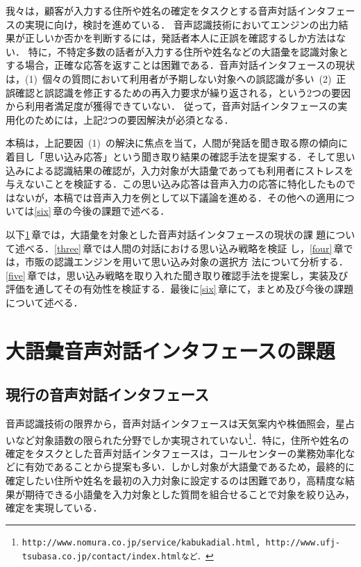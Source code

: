 我々は，顧客が入力する住所や姓名の確定をタスクとする音声対話インタフェースの実現に向け，検討を進めている．
音声認識技術においてエンジンの出力結果が正しいか否かを判断するには，発話者本人に正誤を確認するしか方法はない．
特に，不特定多数の話者が入力する住所や姓名などの大語彙を認識対象とする場合，正確な応答を返すことは困難である．音声対話インタフェースの現状は，(1)~個々の質問において利用者が予期しない対象への誤認識が多い~(2)~正誤確認と誤認識を修正するための再入力要求が繰り返される，という2つの要因から利用者満足度が獲得できていない．
従って，音声対話インタフェースの実用化のためには，上記2つの要因解決が必須となる．

本稿は，上記要因~(1)~の解決に焦点を当て，人間が発話を聞き取る際の傾向に着目し「思い込み応答」という聞き取り結果の確認手法を提案する．そして思い込みによる認識結果の確認が，入力対象が大語彙であっても利用者にストレスを与えないことを検証する．この思い込み応答は音声入力の応答に特化したものではないが，本稿では音声入力を例として以下議論を進める．その他への適用については\ref{six}\,章の今後の課題で述べる．

以下\ref{two}\,章では，大語彙を対象とした音声対話インタフェースの現状の課
題について述べる．\ref{three}\,章では人間の対話における思い込み戦略を検証
し，\ref{four}\,章では，市販の認識エンジンを用いて思い込み対象の選択方
法について分析する．\ref{five}\,章では，思い込み戦略を取り入れた聞き取り確認手法を提案し，実装及び評価を通してその有効性を検証する．最後に\ref{six}\,章にて，まとめ及び今後の課題について述べる．

\section{大語彙音声対話インタフェースの課題}
\label{two}

\subsection{現行の音声対話インタフェース}
\label{two-two}
音声認識技術の限界から，音声対話インタフェースは天気案内や株価照会，星占いなど対象語数の限られた分野でしか実現されていない\footnote{\tt{http://www.nomura.co.jp/service/kabukadial.html, http://www.ufj-tsubasa.co.jp/contact/index.html}など．}．特に，住所や姓名の確定をタスクとした音声対話インタフェースは，コールセンターの業務効率化などに有効であることから提案も多い\cite{Akahori1995,Arai1995,Yoshioka1997}．しかし対象が大語彙であるため，最終的に確定したい住所や姓名を最初の入力対象に設定するのは困難であり，高精度な結果が期待できる小語彙を入力対象とした質問を組合せることで対象を絞り込み，確定を実現している．

